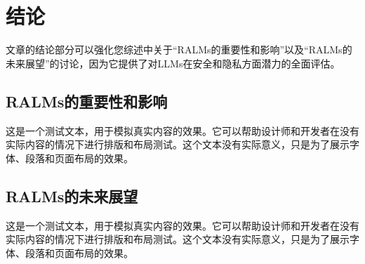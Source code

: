 
\chapter{结论}

文章的结论部分可以强化您综述中关于“RALMs的重要性和影响”以及“RALMs的未来展望”的讨论，因为它提供了对LLMs在安全和隐私方面潜力的全面评估。~\cite{Yao2024}

\section{RALMs的重要性和影响}

这是一个测试文本，用于模拟真实内容的效果。它可以帮助设计师和开发者在没有实际内容的情况下进行排版和布局测试。这个文本没有实际意义，只是为了展示字体、段落和页面布局的效果。

\section{RALMs的未来展望}

这是一个测试文本，用于模拟真实内容的效果。它可以帮助设计师和开发者在没有实际内容的情况下进行排版和布局测试。这个文本没有实际意义，只是为了展示字体、段落和页面布局的效果。
